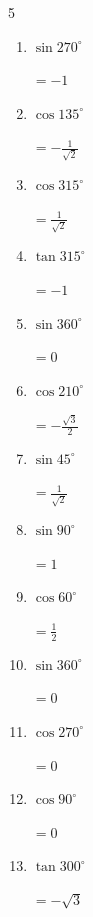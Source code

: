 \begin{multicols}{5}
\begin{enumerate}
  \item $\displaystyle \sin{270^\circ}$

        $\displaystyle =-1$

  \item $\displaystyle \cos{135^\circ}$

        $\displaystyle =-\frac{1}{\sqrt{2}}$

  \item $\displaystyle \cos{315^\circ}$

        $\displaystyle =\frac{1}{\sqrt{2}}$

\columnbreak %

\resetques

  \item $\displaystyle \tan{315^\circ}$

        $\displaystyle =-1$

  \item $\displaystyle \sin{360^\circ}$

        $\displaystyle =0$

  \item $\displaystyle \cos{210^\circ}$

        $\displaystyle =-\frac{\sqrt{3}}{2}$

  \item $\displaystyle \sin{45^\circ}$

        $\displaystyle =\frac{1}{\sqrt{2}}$

  \item $\displaystyle \sin{90^\circ}$

        $\displaystyle =1$

  \item $\displaystyle \cos{60^\circ}$

        $\displaystyle =\frac{1}{2}$

  \item $\displaystyle \sin{360^\circ}$

        $\displaystyle =0$

  \item $\displaystyle \cos{270^\circ}$

        $\displaystyle =0$

  \item $\displaystyle \cos{90^\circ}$

        $\displaystyle =0$

  \item $\displaystyle \tan{300^\circ}$

        $\displaystyle =-\sqrt{3}$


\end{enumerate}
\end{multicols}
